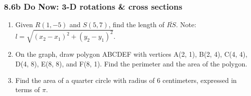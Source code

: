 \documentclass[12pt, twoside]{article}
\begin{document}
\subsubsection*{8.6b Do Now: 3-D rotations \& cross sections}
 \begin{enumerate}

  \item Given $R(1,-5)$ and $S(5,7)$, find the length of $\overline{RS}$. Note: $l=\sqrt{(x_2-x_1)^2+(y_2-y_1)^2}$. \vspace{4cm}

  \item On the graph, draw polygon ABCDEF with vertices A(2, 1), B(2, 4), C(4, 4), D(4, 8), E(8, 8), and F(8, 1). Find the perimeter and the area of the polygon.\\[1cm]
  \vspace{1cm}
  
  \item Find the area of a quarter circle with radius of 6 centimeters, expressed in terms of $\pi$.
  \begin{flushright}
 \end{flushright} %



\newpage

\end{enumerate}
\end{document}
